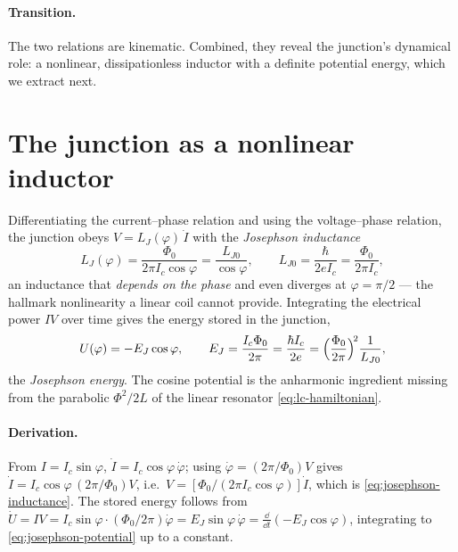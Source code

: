 \paragraph{Transition.}
The two relations are kinematic. Combined, they reveal the junction's
dynamical role: a nonlinear, dissipationless inductor with a definite
potential energy, which we extract next.

\section{The junction as a nonlinear inductor}
\label{sec:josephson-energy}

\begin{statement}
\label{stmt:josephson-energy}
Differentiating the current--phase relation and using the
voltage--phase relation, the junction obeys $V=L_J(\varphi)\,\dot I$
with the \emph{Josephson inductance}
\begin{equation}
\label{eq:josephson-inductance}
L_J(\varphi)=\frac{\Phi_0}{2\pi I_c\cos\varphi}
=\frac{L_{J0}}{\cos\varphi},
\qquad
L_{J0}=\frac{\hbar}{2eI_c}=\frac{\Phi_0}{2\pi I_c},
\end{equation}
an inductance that \emph{depends on the phase} and even diverges at
$\varphi=\pi/2$ --- the hallmark nonlinearity a linear coil cannot
provide. Integrating the electrical power $IV$ over time gives the
energy stored in the junction,
\begin{equation}
\label{eq:josephson-potential}
U(\varphi) = -E_J\cos\varphi,
\qquad
E_J=\frac{I_c\Phi_0}{2\pi}=\frac{\hbar I_c}{2e}=\Bigl(\frac{\Phi_0}{2\pi}\Bigr)^{\!2}\frac{1}{L_{J0}},
\end{equation}
the \emph{Josephson energy}. The cosine potential is the
anharmonic ingredient missing from the parabolic $\Phi^2/2L$ of the
linear resonator \cref{eq:lc-hamiltonian}.
\end{statement}

\paragraph{Derivation.}
From $I=I_c\sin\varphi$, $\dot I=I_c\cos\varphi\,\dot\varphi$; using
$\dot\varphi=(2\pi/\Phi_0)V$ gives
$\dot I=I_c\cos\varphi\,(2\pi/\Phi_0)V$, i.e.\
$V=[\Phi_0/(2\pi I_c\cos\varphi)]\dot I$, which is
\cref{eq:josephson-inductance}. The stored energy follows from
$\dot U=IV=I_c\sin\varphi\cdot(\Phi_0/2\pi)\dot\varphi
=E_J\sin\varphi\,\dot\varphi=\frac{\dd}{\dd t}(-E_J\cos\varphi)$,
integrating to \cref{eq:josephson-potential} up to a constant.

